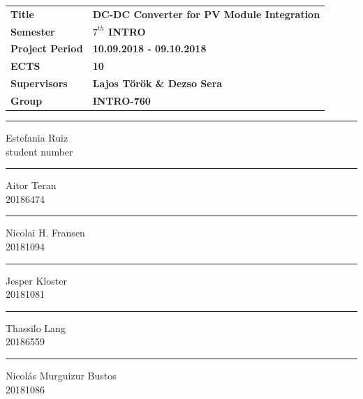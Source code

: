 \vspace*{1cm}
\begin{table}[H]
	\begin{tabular}{l l} 
		\textbf{Title} &  \textbf{DC-DC Converter for PV Module Integration} \\ 
		\textbf{Semester} & \textbf{$7^{th}$ INTRO}  \\ 
		\textbf{Project Period} & \textbf{10.09.2018 - 09.10.2018}  \\ 
		\textbf{ECTS} &  \textbf{10}\\ 
		\textbf{Supervisors} & \textbf{Lajos Török \& Dezso Sera}  \\ 
		\textbf{Group} & \textbf{INTRO-760}  \\ 
	\end{tabular}
\end{table}

\vspace*{2cm}
\begin{center}	
	\vspace{40pt}
	\begin{minipage}{0.4\linewidth}
		\centering
		\hrule
		\vspace{12pt}
		Estefania Ruiz\\ 
		student number
	\end{minipage}
	\hspace{10pt}
	\vspace{40pt}
	\begin{minipage}{0.4\linewidth}
		\centering
		\hrule
		\vspace{12pt}
		Aitor Teran\\ 
		20186474	
	\end{minipage}
	\hspace{10pt}
	\vspace{40pt}
	\begin{minipage}{0.4\linewidth}
		\centering
		\hrule
		\vspace{12pt}
		Nicolai H. Fransen\\
		20181094
	\end{minipage}
	\hspace{10pt}
	\begin{minipage}{0.4\linewidth}
		\centering
		\hrule
		\vspace{12pt}
		Jesper Kloster\\
		20181081 
	\end{minipage}
	\hspace{10pt}
	\begin{minipage}{0.4\linewidth}
		\centering
		\hrule
		\vspace{12pt}
		Thassilo Lang\\ 
		20186559 
	\end{minipage}
	\hspace{10pt}
	\vspace{20pt}
	\begin{minipage}{0.4\linewidth}
		\centering
		\hrule
		\vspace{12pt}
		Nicolás Murguizur Bustos\\ 
		20181086
	\end{minipage}
\end{center}

